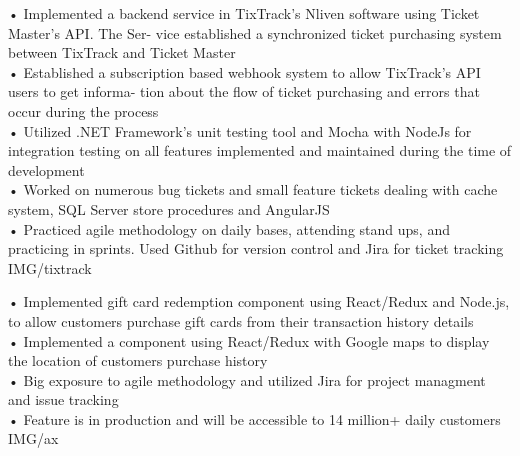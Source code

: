 \documentclass[paper=a4,fontsize=11pt]{temp} %
\begin{document}
\sepspace

{• Implemented a backend service in TixTrack’s Nliven software using Ticket Master’s API. The Ser- vice established a synchronized ticket purchasing system between TixTrack and Ticket Master
\\ • Established a subscription based webhook system to allow TixTrack’s API users to get informa- tion about the flow of ticket purchasing and errors that occur during the process
\\ • Utilized .NET Framework’s unit testing tool and Mocha with NodeJs for integration testing on all features implemented and maintained during the time of development
\\ • Worked on numerous bug tickets and small feature tickets dealing with cache system, SQL Server store procedures and AngularJS
\\ • Practiced agile methodology on daily bases, attending stand ups, and practicing in sprints. Used Github for version control and Jira for ticket tracking
} {IMG/tixtrack}

\sepspace

{• Implemented gift card redemption component using React/Redux and Node.js, to allow customers purchase gift cards from their transaction history details
\\ • Implemented a component using React/Redux with Google maps to display the location of customers purchase history
\\ • Big exposure to agile methodology and utilized Jira for project managment and issue tracking
\\ • Feature is in production and will be accessible to 14 million+ daily customers
} {IMG/ax}

\sepspace

\sepspace
\end{document}
